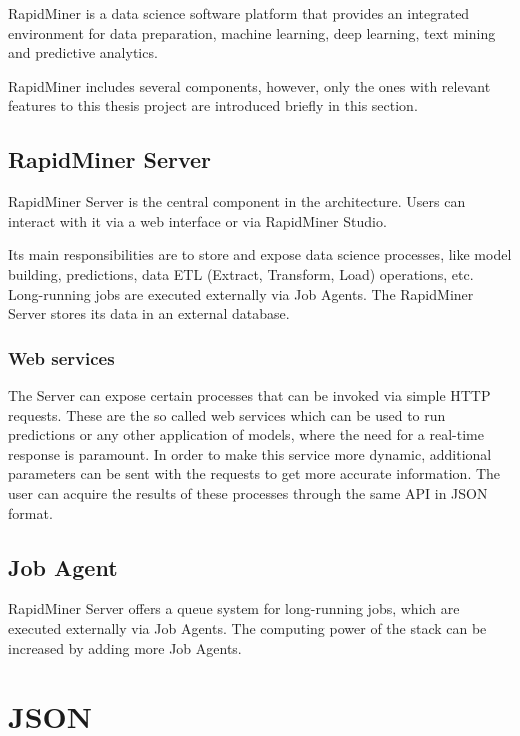 RapidMiner is a data science software platform that provides an integrated environment for data preparation, machine learning, deep learning, text mining and predictive analytics.

RapidMiner includes several components, however, only the ones with relevant features to this thesis project are introduced briefly in this section.

\subsection{RapidMiner Server}

RapidMiner Server is the central component in the architecture. Users can interact with it via a web interface or via RapidMiner Studio.

Its main responsibilities are to store and expose data science processes, like model building, predictions, data ETL (Extract, Transform, Load) operations, etc. Long-running jobs are executed externally via Job Agents. The RapidMiner Server stores its data in an external database.

\subsubsection{Web services}
The Server can expose certain processes that can be invoked via simple HTTP requests. These are the so called web services which can be used to run predictions or any other application of models, where the need for a real-time response is paramount. In order to make this service more dynamic, additional parameters can be sent with the requests to get more accurate information. The user can acquire the results of these processes through the same API in JSON format.

\subsection{Job Agent}

RapidMiner Server offers a queue system for long-running jobs, which are executed externally via Job Agents. The computing power of the stack can be increased by adding more Job Agents.

\section{JSON}


